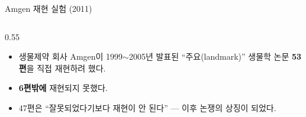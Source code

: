\begin{frame}{Amgen 재현 실험 (2011)}
  \begin{columns}[T]
    \begin{column}{0.55\textwidth}
      \begin{itemize}
        \item 생물제약 회사 Amgen이 1999$\sim$2005년 발표된
          ``주요(landmark)'' 생물학 논문 \textbf{53편}을 직접
          재현하려 했다.
        \item \textbf{6편밖에} 재현되지 못했다.
        \item 47편은 ``잘못되었다기보다 재현이 안 된다'' ---
          이후  논쟁의 상징이 되었다.
      \end{itemize}
    \end{column}
  \end{columns}
\end{frame}
